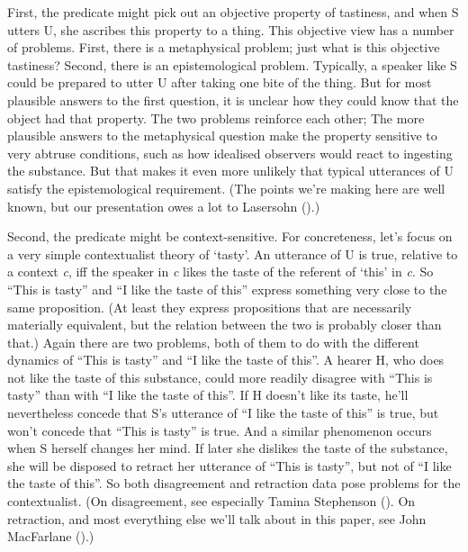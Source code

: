 \documentclass[
  10pt,
  letterpaper,
  DIV=11,
  numbers=noendperiod,
  twoside]{scrartcl}
\begin{document}
First, the predicate might pick out an objective property of tastiness,
and when S utters U, she ascribes this property to a thing. This
objective view has a number of problems. First, there is a metaphysical
problem; just what is this objective tastiness? Second, there is an
epistemological problem. Typically, a speaker like S could be prepared
to utter U after taking one bite of the thing. But for most plausible
answers to the first question, it is unclear how they could know that
the object had that property. The two problems reinforce each other; The
more plausible answers to the metaphysical question make the property
sensitive to very abtruse conditions, such as how idealised observers
would react to ingesting the substance. But that makes it even more
unlikely that typical utterances of U satisfy the epistemological
requirement. (The points we're making here are well known, but our
presentation owes a lot to Lasersohn
().)

Second, the predicate might be context-sensitive. For concreteness,
let's focus on a very simple contextualist theory of `tasty'. An
utterance of U is true, relative to a context \emph{c}, iff the speaker
in \emph{c} likes the taste of the referent of `this' in \emph{c}. So
``This is tasty'' and ``I like the taste of this'' express something
very close to the same proposition. (At least they express propositions
that are necessarily materially equivalent, but the relation between the
two is probably closer than that.) Again there are two problems, both of
them to do with the different dynamics of ``This is tasty'' and ``I like
the taste of this''. A hearer H, who does not like the taste of this
substance, could more readily disagree with ``This is tasty'' than with
``I like the taste of this''. If H doesn't like its taste, he'll
nevertheless concede that S's utterance of ``I like the taste of this''
is true, but won't concede that ``This is tasty'' is true. And a similar
phenomenon occurs when S herself changes her mind. If later she dislikes
the taste of the substance, she will be disposed to retract her
utterance of ``This is tasty'', but not of ``I like the taste of this''.
So both disagreement and retraction data pose problems for the
contextualist. (On disagreement, see especially Tamina Stephenson
(). On retraction, and most
everything else we'll talk about in this paper, see John MacFarlane
().)
\end{document}
